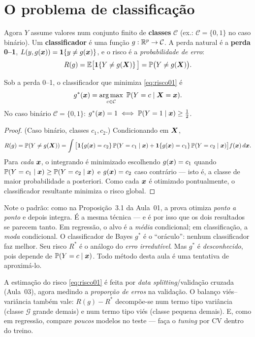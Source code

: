 \documentclass[11pt,a4paper]{article}
\begin{document}
\section{O problema de classificação}
Agora $Y$ assume valores num conjunto finito de \textbf{classes} $\mathcal{C}$ (ex.:
$\mathcal{C}=\{0,1\}$ no caso binário). Um \textbf{classificador} é uma função
$g:\mathbb{R}^p\to\mathcal{C}$. A perda natural é a \textbf{perda 0--1},
$L(y,g(\bm{x}))=\mathbf{1}\!\left\{y\ne g(\bm{x})\right\}$, e o risco é a \emph{probabilidade de erro}:
\begin{equation}\label{eq:risco01}
  R(g) = \mathbb{E}\big[\mathbf{1}\!\left\{Y\ne g(\bm{X})\right\}\big] = \mathbb{P}\big(Y\ne g(\bm{X})\big).
\end{equation}

\begin{teorema}\label{teo:bayes}
Sob a perda 0--1, o classificador que minimiza \eqref{eq:risco01} é
\[
  g^*(\x) = \argmax_{c\in\mathcal{C}}\ \Prob(Y=c\mid \X=\x).
\]
No caso binário $\mathcal{C}=\{0,1\}$: $g^*(\bm{x})=1 \iff \mathbb{P}(Y=1\mid\bm{x})\ge \tfrac12$.
\end{teorema}
\begin{proof}
(Caso binário, classes $c_1,c_2$.) Condicionando em $\bm{X}$,
\[
  R(g)=\mathbb{P}(Y\ne g(\bm{X}))
  =\int \big[\mathbf{1}\!\left\{g(\bm{x})=c_2\right\}\mathbb{P}(Y=c_1\mid\bm{x})+\mathbf{1}\!\left\{g(\bm{x})=c_1\right\}\mathbb{P}(Y=c_2\mid\bm{x})\big]f(\bm{x})\,d\bm{x}.
\]
Para \emph{cada} $\bm{x}$, o integrando é minimizado escolhendo $g(\bm{x})=c_1$ quando
$\mathbb{P}(Y=c_1\mid\bm{x})\ge\mathbb{P}(Y=c_2\mid\bm{x})$ e $g(\bm{x})=c_2$ caso contrário --- isto é,
a classe de maior probabilidade a posteriori. Como cada $\bm{x}$ é otimizado
pontualmente, o classificador resultante minimiza o risco global.
\end{proof}

\begin{ideia}
Note o padrão: como na Proposição~3.1 da Aula~01, a prova otimiza \emph{ponto a
ponto} e depois integra. É a mesma técnica --- e é por isso que os dois resultados
se parecem tanto. Em regressão, o alvo é a \emph{média} condicional; em
classificação, a \emph{moda} condicional. O classificador de Bayes $g^*$ é o
``oráculo'': nenhum classificador faz melhor. Seu risco $R^*$ é o análogo do
\emph{erro irredutível}. Mas $g^*$ é \emph{desconhecido}, pois depende de
$\mathbb{P}(Y=c\mid\bm{x})$. Todo método desta aula é uma tentativa de aproximá-lo.
\end{ideia}

\begin{observacao}
A estimação do risco \eqref{eq:risco01} é feita por \emph{data splitting}/validação
cruzada (Aula~03), agora medindo a \emph{proporção de erros} na validação. O balanço
viés--variância também vale: $R(g)-R^*$ decompõe-se num termo tipo variância (classe
$\mathcal{G}$ grande demais) e num termo tipo viés (classe pequena demais). E, como
em regressão, compare \emph{poucos} modelos no teste --- faça o \emph{tuning} por CV
dentro do treino.
\end{observacao}
\end{document}
